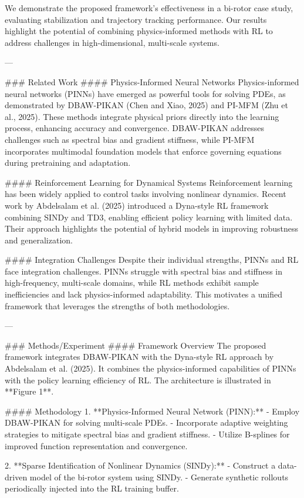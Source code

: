 We demonstrate the proposed framework's effectiveness in a bi-rotor case study, evaluating stabilization and trajectory tracking performance. Our results highlight the potential of combining physics-informed methods with RL to address challenges in high-dimensional, multi-scale systems.

---

### Related Work
#### Physics-Informed Neural Networks
Physics-informed neural networks (PINNs) have emerged as powerful tools for solving PDEs, as demonstrated by DBAW-PIKAN (Chen and Xiao, 2025) and PI-MFM (Zhu et al., 2025). These methods integrate physical priors directly into the learning process, enhancing accuracy and convergence. DBAW-PIKAN addresses challenges such as spectral bias and gradient stiffness, while PI-MFM incorporates multimodal foundation models that enforce governing equations during pretraining and adaptation.

#### Reinforcement Learning for Dynamical Systems
Reinforcement learning has been widely applied to control tasks involving nonlinear dynamics. Recent work by Abdelsalam et al. (2025) introduced a Dyna-style RL framework combining SINDy and TD3, enabling efficient policy learning with limited data. Their approach highlights the potential of hybrid models in improving robustness and generalization.

#### Integration Challenges
Despite their individual strengths, PINNs and RL face integration challenges. PINNs struggle with spectral bias and stiffness in high-frequency, multi-scale domains, while RL methods exhibit sample inefficiencies and lack physics-informed adaptability. This motivates a unified framework that leverages the strengths of both methodologies.

---

### Methods/Experiment
#### Framework Overview
The proposed framework integrates DBAW-PIKAN with the Dyna-style RL approach by Abdelsalam et al. (2025). It combines the physics-informed capabilities of PINNs with the policy learning efficiency of RL. The architecture is illustrated in **Figure 1**.

#### Methodology
1. **Physics-Informed Neural Network (PINN):**
   - Employ DBAW-PIKAN for solving multi-scale PDEs.
   - Incorporate adaptive weighting strategies to mitigate spectral bias and gradient stiffness.
   - Utilize B-splines for improved function representation and convergence.

2. **Sparse Identification of Nonlinear Dynamics (SINDy):**
   - Construct a data-driven model of the bi-rotor system using SINDy.
   - Generate synthetic rollouts periodically injected into the RL training buffer.

